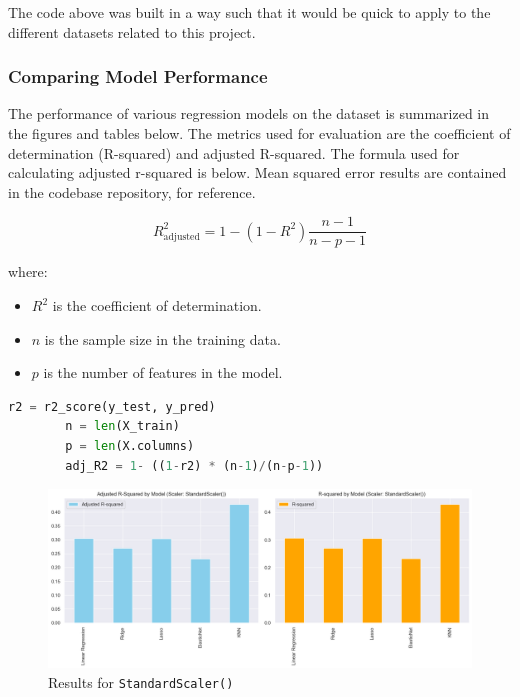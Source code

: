 \documentclass{article}
\theoremstyle{mytheoremstyle}
\theoremstyle{mytheoremstyle}
\theoremstyle{myproblemstyle}
\begin{document}
The code above was built in a way such that it would be quick to apply to the different datasets related to this project. 

\pagebreak

\subsubsection{Comparing Model Performance}

The performance of various regression models on the dataset is summarized in the figures and tables below. The metrics used for evaluation are the coefficient of determination (R-squared) and adjusted R-squared. The formula used for calculating adjusted r-squared is below. Mean squared error results are contained in the codebase repository, for reference. 



    \[
R_{\text{adjusted}}^2 = 1 - (1 - R^2) \frac{n - 1}{n - p - 1}\]

where:
\begin{itemize}
    \item $R^2$ is the coefficient of determination.
    \item $n$ is the sample size in the training data.
    \item $p$ is the number of features in the model.
\end{itemize}

\begin{lstlisting}[language=Python, caption=R-squared computation within evaluation function]
        r2 = r2_score(y_test, y_pred)
        n = len(X_train)
        p = len(X.columns)
        adj_R2 = 1- ((1-r2) * (n-1)/(n-p-1))
\end{lstlisting}


\begin{figure}[htbp]
\centering
\includegraphics[width=\linewidth]{./Images/evalRegModelStandardScaler.png}
\caption{Results for \texttt{StandardScaler()}}
\label{fig:Standard Scaler Results}
\end{figure}
\end{document}
